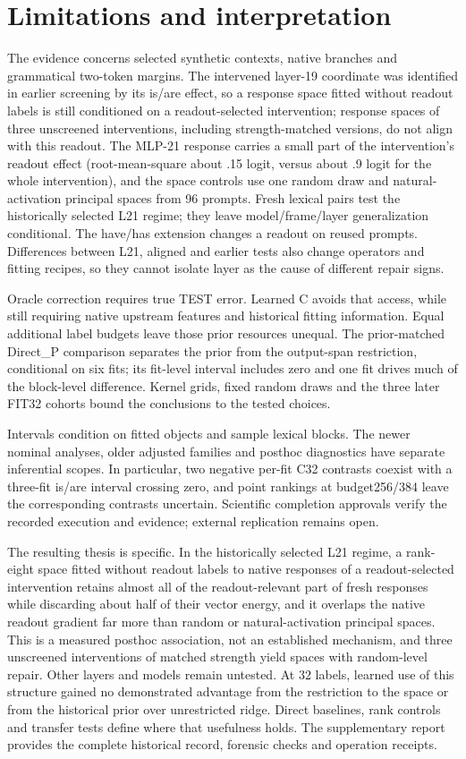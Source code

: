 \documentclass[11pt]{article}
\begin{document}
\section{Limitations and interpretation}
The evidence concerns selected synthetic contexts, native branches and grammatical two-token margins. The intervened layer-19 coordinate was identified in earlier screening by its is/are effect, so a response space fitted without readout labels is still conditioned on a readout-selected intervention; response spaces of three unscreened interventions, including strength-matched versions, do not align with this readout. The MLP-21 response carries a small part of the intervention's readout effect (root-mean-square about .15 logit, versus about .9 logit for the whole intervention), and the space controls use one random draw and natural-activation principal spaces from 96 prompts. Fresh lexical pairs test the historically selected L21 regime; they leave model/frame/layer generalization conditional. The have/has extension changes a readout on reused prompts. Differences between L21, aligned and earlier tests also change operators and fitting recipes, so they cannot isolate layer as the cause of different repair signs.

Oracle correction requires true TEST error. Learned C avoids that access, while still requiring native upstream features and historical fitting information. Equal additional label budgets leave those prior resources unequal. The prior-matched Direct\_P comparison separates the prior from the output-span restriction, conditional on six fits; its fit-level interval includes zero and one fit drives much of the block-level difference. Kernel grids, fixed random draws and the three later FIT32 cohorts bound the conclusions to the tested choices.

Intervals condition on fitted objects and sample lexical blocks. The newer nominal analyses, older adjusted families and posthoc diagnostics have separate inferential scopes. In particular, two negative per-fit C32 contrasts coexist with a three-fit is/are interval crossing zero, and point rankings at budget256/384 leave the corresponding contrasts uncertain. Scientific completion approvals verify the recorded execution and evidence; external replication remains open.

The resulting thesis is specific. In the historically selected L21 regime, a rank-eight space fitted without readout labels to native responses of a readout-selected intervention retains almost all of the readout-relevant part of fresh responses while discarding about half of their vector energy, and it overlaps the native readout gradient far more than random or natural-activation principal spaces. This is a measured posthoc association, not an established mechanism, and three unscreened interventions of matched strength yield spaces with random-level repair. Other layers and models remain untested. At 32 labels, learned use of this structure gained no demonstrated advantage from the restriction to the space or from the historical prior over unrestricted ridge. Direct baselines, rank controls and transfer tests define where that usefulness holds. The supplementary report provides the complete historical record, forensic checks and operation receipts.
\end{document}
